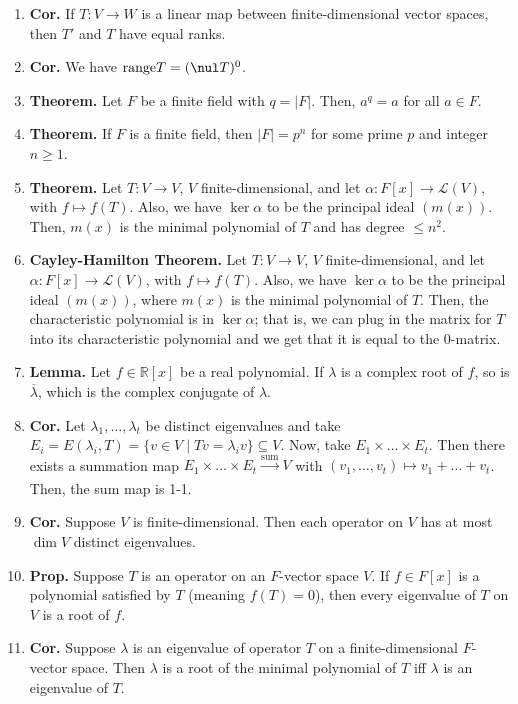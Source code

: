 \begin{enumerate}
	\item \textbf{Cor. } If $T: V \to W$ is a linear map between finite-dimensional vector spaces, then $T'$ and $T$ have equal ranks. 
	\item \textbf{Cor. } We have $\textrm{range}T = (\nul T)^0$. 
	\item \textbf{Theorem. } Let $F$ be a finite field with $q = |F|$. Then, $a^q=a$ for all $a \in F$. 
	\item \textbf{Theorem. } If $F$ is a finite field, then $|F|=p^n$ for some prime $p$ and integer $n \geq 1$. 
	\item \textbf{Theorem. } Let $T: V \to V$, $V$ finite-dimensional, and let $\alpha: F[x] \to \mathscr{L}(V)$, with $f \mapsto f(T)$. Also, we have $\ker\alpha$ to be the principal ideal $(m(x))$. Then, $m(x)$ is the minimal polynomial of $T$ and has degree $\leq n^2$. 
	\item \textbf{Cayley-Hamilton Theorem. } Let $T: V \to V$, $V$ finite-dimensional, and let $\alpha: F[x] \to \mathscr{L}(V)$, with $f \mapsto f(T)$. Also, we have $\ker\alpha$ to be the principal ideal $(m(x))$, where $m(x)$ is the minimal polynomial of $T$. Then, the characteristic polynomial is in $\ker\alpha$; that is, we can plug in the matrix for $T$ into its characteristic polynomial and we get that it is equal to the 0-matrix. 
	\item \textbf{Lemma. } Let $f \in \mathbb{R}[x]$ be a real polynomial. If $\lambda$ is a complex root of $f$, so is $\overline{\lambda}$, which is the complex conjugate of $\lambda$. 
	\item \textbf{Cor. } Let $\lambda_1,\dots,\lambda_t$ be distinct eigenvalues and take $E_i = E(\lambda_i,T) = \{v \in V \mid Tv = \lambda_iv\} \subseteq V$. Now, take $E_1 \times \dots \times E_t$. Then there exists a summation map $E_1 \times \dots \times E_t \xrightarrow[]{\textrm{sum}} V$ with $(v_1,\dots,v_t) \mapsto v_1 + \dots + v_t$. Then, the sum map is 1-1. 
	\item \textbf{Cor. } Suppose $V$ is finite-dimensional. Then each operator on $V$ has at most $\dim V$ distinct eigenvalues. 
	\item \textbf{Prop. } Suppose $T$ is an operator on an $F$-vector space $V$. If $f \in F[x]$ is a polynomial satisfied by $T$ (meaning $f(T)=0$), then every eigenvalue of $T$ on $V$ is a root of $f$. 
	\item \textbf{Cor. } Suppose $\lambda$ is an eigenvalue of operator $T$ on a finite-dimensional $F$-vector space. Then $\lambda$ is a root of the minimal polynomial of $T$ iff $\lambda$ is an eigenvalue of $T$. 

\end{enumerate}
